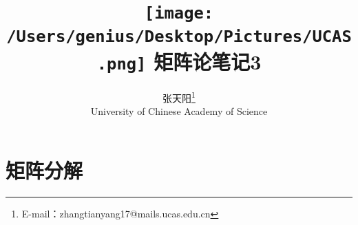 \documentclass[12pt]{article}
\begin{document}
\begin{CJK*}{UTF8}{gbsn}

\begin{titlepage}
	
\title{\protect \texttt{[image: /Users/genius/Desktop/Pictures/UCAS.png]} \Huge \textbf{矩阵论笔记3}}

\author{张天阳\thanks{E-mail：zhangtianyang17@mails.ucas.edu.cn}\\
University of Chinese Academy of Science}
\maketitle
\end{titlepage}



\tableofcontents

\pagebreak

\part{矩阵分解}

\end{CJK*}
\end{document}
